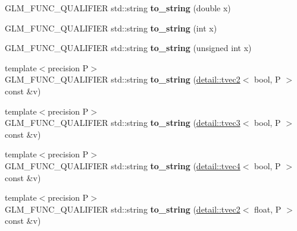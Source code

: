 \begin{DoxyCompactItemize}
\item 
G\+L\+M\+\_\+\+F\+U\+N\+C\+\_\+\+Q\+U\+A\+L\+I\+F\+I\+ER std\+::string {\bfseries to\+\_\+string} (double x)\hypertarget{namespaceglm_adda934ba3c94a727a59b850fbc7431d3}{}\label{namespaceglm_adda934ba3c94a727a59b850fbc7431d3}

\item 
G\+L\+M\+\_\+\+F\+U\+N\+C\+\_\+\+Q\+U\+A\+L\+I\+F\+I\+ER std\+::string {\bfseries to\+\_\+string} (int x)\hypertarget{namespaceglm_aaa0a03765f0abafa90fa4f605ce016b9}{}\label{namespaceglm_aaa0a03765f0abafa90fa4f605ce016b9}

\item 
G\+L\+M\+\_\+\+F\+U\+N\+C\+\_\+\+Q\+U\+A\+L\+I\+F\+I\+ER std\+::string {\bfseries to\+\_\+string} (unsigned int x)\hypertarget{namespaceglm_aedf5aff2c68a8c282820904ba2396625}{}\label{namespaceglm_aedf5aff2c68a8c282820904ba2396625}

\item 
{\footnotesize template$<$precision P$>$ }\\G\+L\+M\+\_\+\+F\+U\+N\+C\+\_\+\+Q\+U\+A\+L\+I\+F\+I\+ER std\+::string {\bfseries to\+\_\+string} (\hyperlink{structglm_1_1detail_1_1tvec2}{detail\+::tvec2}$<$ bool, P $>$ const \&v)\hypertarget{namespaceglm_a68ac143fd7a22236f078e45cf8788cbe}{}\label{namespaceglm_a68ac143fd7a22236f078e45cf8788cbe}

\item 
{\footnotesize template$<$precision P$>$ }\\G\+L\+M\+\_\+\+F\+U\+N\+C\+\_\+\+Q\+U\+A\+L\+I\+F\+I\+ER std\+::string {\bfseries to\+\_\+string} (\hyperlink{structglm_1_1detail_1_1tvec3}{detail\+::tvec3}$<$ bool, P $>$ const \&v)\hypertarget{namespaceglm_afb3ab72a854a2aae00b8fd819f4b6dd1}{}\label{namespaceglm_afb3ab72a854a2aae00b8fd819f4b6dd1}

\item 
{\footnotesize template$<$precision P$>$ }\\G\+L\+M\+\_\+\+F\+U\+N\+C\+\_\+\+Q\+U\+A\+L\+I\+F\+I\+ER std\+::string {\bfseries to\+\_\+string} (\hyperlink{structglm_1_1detail_1_1tvec4}{detail\+::tvec4}$<$ bool, P $>$ const \&v)\hypertarget{namespaceglm_a52849ff41e38c4cfcf17d832b3114450}{}\label{namespaceglm_a52849ff41e38c4cfcf17d832b3114450}

\item 
{\footnotesize template$<$precision P$>$ }\\G\+L\+M\+\_\+\+F\+U\+N\+C\+\_\+\+Q\+U\+A\+L\+I\+F\+I\+ER std\+::string {\bfseries to\+\_\+string} (\hyperlink{structglm_1_1detail_1_1tvec2}{detail\+::tvec2}$<$ float, P $>$ const \&v)\hypertarget{namespaceglm_a6698c0d7c025b7261f4eb51b1baf7290}{}\label{namespaceglm_a6698c0d7c025b7261f4eb51b1baf7290}


\end{DoxyCompactItemize}
